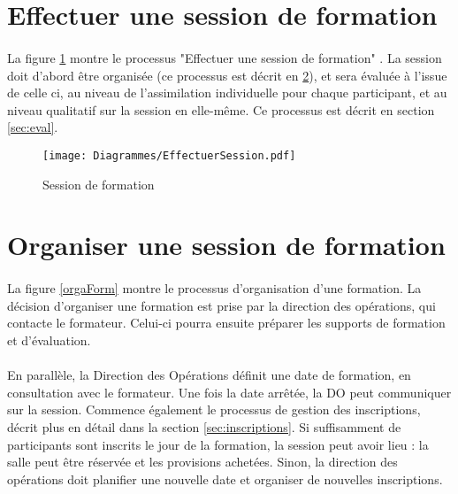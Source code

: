 \section{Effectuer une session de formation}
\paragraph{} La figure \ref{effSession} montre le processus "Effectuer une session de formation" . La session doit d'abord être organisée (ce processus est décrit en \ref{sec:Orga}), et sera évaluée à l'issue de celle ci, au niveau de l'assimilation individuelle pour chaque participant, et au niveau qualitatif sur la session en elle-même. Ce processus est décrit en section \ref{sec:eval}.

\begin{figure}[H]
	\centering
	\texttt{[image: Diagrammes/EffectuerSession.pdf]}
	\caption{Session de formation} 
	\label{effSession}
\end{figure}
 	



\section{Organiser une session de formation}
\label{sec:Orga}

\paragraph{}La figure \ref{orgaForm} montre le processus d'organisation d'une formation. La décision d'organiser une formation est prise par la direction des opérations, qui contacte le formateur. Celui-ci pourra ensuite préparer les supports de formation et d'évaluation.
\paragraph{} En parallèle, la Direction des Opérations définit une date de formation, en consultation avec le formateur. Une fois la date arrêtée, la DO peut communiquer sur la session. Commence également le processus de gestion des inscriptions, décrit plus en détail dans la section \ref{sec:inscriptions}. Si suffisamment de participants sont inscrits le jour de la formation, la session peut avoir lieu : la salle peut être réservée et les provisions achetées. Sinon, la direction des opérations doit planifier une nouvelle date et organiser de nouvelles inscriptions.
